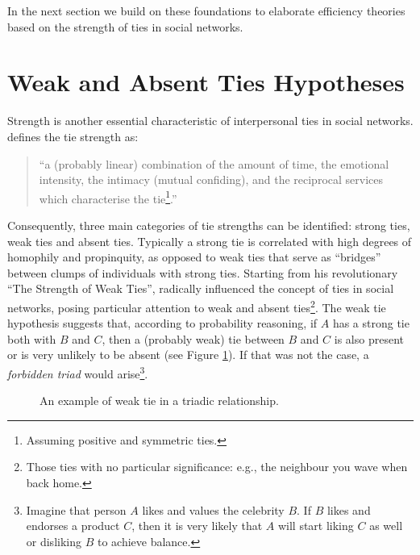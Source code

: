 In the next section we build on these foundations to elaborate efficiency
theories based on the strength of ties in social networks.

\section{Weak and Absent Ties Hypotheses}

Strength is another essential characteristic of interpersonal ties
in social networks. \citet{Granovetter1973The-Strenght-of} defines
the tie strength as:

\begin{spacing}{1}
\begin{quotation}
\textquotedblleft a (probably linear) combination of the amount of
time, the emotional intensity, the intimacy (mutual confiding), and
the reciprocal services which characterise the tie\footnote{Assuming positive and symmetric ties.}.\textquotedblright{}
\end{quotation}
\end{spacing}

Consequently, three main categories of tie strengths can be identified:
strong ties, weak ties and absent ties. Typically a strong tie is
correlated with high degrees of homophily and propinquity, as opposed
to weak ties that serve as \textquotedblleft bridges\textquotedblright{}
between clumps of individuals with strong ties. Starting from his
revolutionary \textquotedblleft The Strength of Weak Ties\textquotedblright ,
\citet{Granovetter1973The-Strenght-of} radically influenced the concept
of ties in social networks, posing particular attention to weak and
absent ties\footnote{Those ties with no particular significance: e.g., the neighbour you
wave when back home. }. The weak tie hypothesis suggests that, according to probability
reasoning, if $A$ has a strong tie both with $B$ and $C$, then
a (probably weak) tie between $B$ and $C$ is also present \textendash{}
or is very unlikely to be absent (see Figure \ref{fig:Weak-tie-in}).
If that was not the case, a \textit{forbidden triad} would arise\footnote{Imagine that person $A$ likes and values the celebrity $B$. If $B$
likes and endorses a product $C$, then it is very likely that $A$
will start liking $C$ as well \textendash{} or disliking $B$ \textendash{}
to achieve balance. }. 

\begin{figure}[h]
\begin{centering}
\par\end{centering}
\centering{}\caption{An example of weak tie in a triadic relationship.\label{fig:Weak-tie-in}}
\end{figure}

